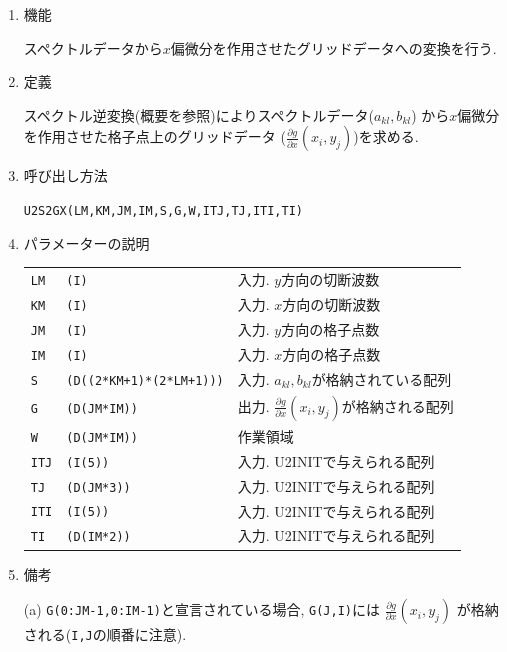 \documentclass[a4j,fleqn]{jarticle}
\begin{document}
\begin{enumerate}

\item 機能 

スペクトルデータから$x$偏微分を作用させたグリッドデータへの変換を行う.

\item 定義

スペクトル逆変換(概要を参照)によりスペクトルデータ($a_{kl},b_{kl}$)
から$x$偏微分を作用させた格子点上のグリッドデータ
($\frac{\partial g}{\partial x}(x_i,y_j)$)を求める.

\item 呼び出し方法 

{\tt U2S2GX(LM,KM,JM,IM,S,G,W,ITJ,TJ,ITI,TI)}
  
\item パラメーターの説明

\begin{tabular}{lll}
{\tt LM} & {\tt (I)} & 入力. $y$方向の切断波数\\
{\tt KM} & {\tt (I)} & 入力. $x$方向の切断波数\\
{\tt JM} & {\tt (I)} & 入力. $y$方向の格子点数\\
{\tt IM} & {\tt (I)} & 入力. $x$方向の格子点数\\
{\tt S} & {\tt (D((2*KM+1)*(2*LM+1)))} & 入力. $a_{kl},b_{kl}$が格納されている配列\\
{\tt G} & {\tt (D(JM*IM))} & 出力. $\frac{\partial g}{\partial x}(x_i,y_j)$が格納される配列\\
{\tt W} & {\tt (D(JM*IM))} & 作業領域\\
{\tt ITJ} & {\tt (I(5))} & 入力. U2INITで与えられる配列\\
{\tt TJ} & {\tt (D(JM*3))} & 入力. U2INITで与えられる配列\\
{\tt ITI} & {\tt (I(5))} & 入力. U2INITで与えられる配列\\
{\tt TI} & {\tt (D(IM*2))} & 入力. U2INITで与えられる配列
\end{tabular}

\item 備考

(a) {\tt G(0:JM-1,0:IM-1)}と宣言されている場合, {\tt G(J,I)}には
    $\frac{\partial g}{\partial x}(x_i,y_j)$
    が格納される({\tt I,J}の順番に注意).

\end{enumerate}

\end{document}
